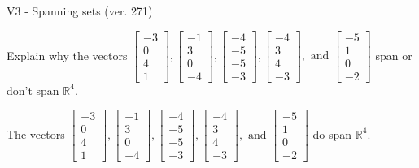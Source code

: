 \begin{exercise}
  \begin{exerciseTitle}V3 - Spanning sets (ver. 271)\end{exerciseTitle}
  \begin{exerciseStatement}
    Explain why the vectors \(\left[\begin{array}{r}
-3 \\
0 \\
4 \\
1
\end{array}\right] , \left[\begin{array}{r}
-1 \\
3 \\
0 \\
-4
\end{array}\right] , \left[\begin{array}{r}
-4 \\
-5 \\
-5 \\
-3
\end{array}\right] , \left[\begin{array}{r}
-4 \\
3 \\
4 \\
-3
\end{array}\right] , \text{ and } \left[\begin{array}{r}
-5 \\
1 \\
0 \\
-2
\end{array}\right]\) span or don't span \(\mathbb{R}^4\). 
	


  \end{exerciseStatement}
  \begin{exerciseAnswer}
   The vectors \(\left[\begin{array}{r}
-3 \\
0 \\
4 \\
1
\end{array}\right] , \left[\begin{array}{r}
-1 \\
3 \\
0 \\
-4
\end{array}\right] , \left[\begin{array}{r}
-4 \\
-5 \\
-5 \\
-3
\end{array}\right] , \left[\begin{array}{r}
-4 \\
3 \\
4 \\
-3
\end{array}\right] , \text{ and } \left[\begin{array}{r}
-5 \\
1 \\
0 \\
-2
\end{array}\right]\) 
  	 do  
	span \(\mathbb{R}^4\).
  



\end{exerciseAnswer}
\end{exercise}
